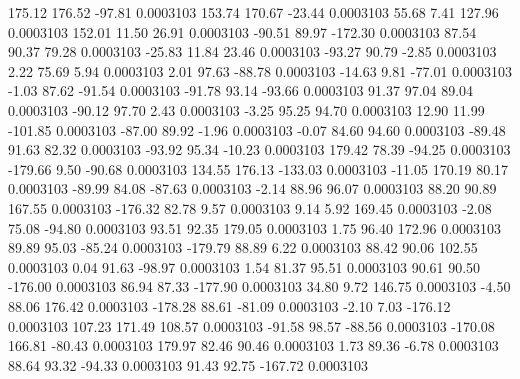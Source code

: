       175.12      176.52      -97.81     0.0003103
      153.74      170.67      -23.44     0.0003103
       55.68        7.41      127.96     0.0003103
      152.01       11.50       26.91     0.0003103
      -90.51       89.97     -172.30     0.0003103
       87.54       90.37       79.28     0.0003103
      -25.83       11.84       23.46     0.0003103
      -93.27       90.79       -2.85     0.0003103
        2.22       75.69        5.94     0.0003103
        2.01       97.63      -88.78     0.0003103
      -14.63        9.81      -77.01     0.0003103
       -1.03       87.62      -91.54     0.0003103
      -91.78       93.14      -93.66     0.0003103
       91.37       97.04       89.04     0.0003103
      -90.12       97.70        2.43     0.0003103
       -3.25       95.25       94.70     0.0003103
       12.90       11.99     -101.85     0.0003103
      -87.00       89.92       -1.96     0.0003103
       -0.07       84.60       94.60     0.0003103
      -89.48       91.63       82.32     0.0003103
      -93.92       95.34      -10.23     0.0003103
      179.42       78.39      -94.25     0.0003103
     -179.66        9.50      -90.68     0.0003103
      134.55      176.13     -133.03     0.0003103
      -11.05      170.19       80.17     0.0003103
      -89.99       84.08      -87.63     0.0003103
       -2.14       88.96       96.07     0.0003103
       88.20       90.89      167.55     0.0003103
     -176.32       82.78        9.57     0.0003103
        9.14        5.92      169.45     0.0003103
       -2.08       75.08      -94.80     0.0003103
       93.51       92.35      179.05     0.0003103
        1.75       96.40      172.96     0.0003103
       89.89       95.03      -85.24     0.0003103
     -179.79       88.89        6.22     0.0003103
       88.42       90.06      102.55     0.0003103
        0.04       91.63      -98.97     0.0003103
        1.54       81.37       95.51     0.0003103
       90.61       90.50     -176.00     0.0003103
       86.94       87.33     -177.90     0.0003103
       34.80        9.72      146.75     0.0003103
       -4.50       88.06      176.42     0.0003103
     -178.28       88.61      -81.09     0.0003103
       -2.10        7.03     -176.12     0.0003103
      107.23      171.49      108.57     0.0003103
      -91.58       98.57      -88.56     0.0003103
     -170.08      166.81      -80.43     0.0003103
      179.97       82.46       90.46     0.0003103
        1.73       89.36       -6.78     0.0003103
       88.64       93.32      -94.33     0.0003103
       91.43       92.75     -167.72     0.0003103
